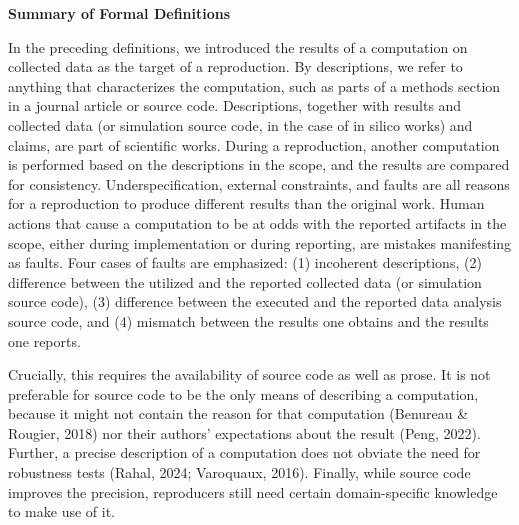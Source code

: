 \documentclass[authordate, meta]{jote-new-article}
\begin{document}
	\begin{rightWide}[Box 2]
	\textbf{Summary of Formal Definitions}
	
	In the preceding definitions, we introduced the results of a computation on collected data as the target of a reproduction. By descriptions, we refer to anything that characterizes the computation, such as parts of a methods section in a journal article or source code. Descriptions, together with results and collected data (or simulation source code, in the case of in silico works) and claims, are part of scientific works. During a reproduction, another computation is performed based on the descriptions in the scope, and the results are compared for consistency. Underspecification, external constraints, and faults are all reasons for a reproduction to produce different results than the original work. Human actions that cause a computation to be at odds with the reported artifacts in the scope, either during implementation or during reporting, are mistakes manifesting as faults. Four cases of faults are emphasized: (1) incoherent descriptions, (2) difference between the utilized and the reported collected data (or simulation source code), (3) difference between the executed and the reported data analysis source code, and (4) mismatch between the results one obtains and the results one reports.
	\end{rightWide}

	Crucially, this requires the availability of source code as well as prose. It is not preferable for source code to be the only means of describing a computation, because it might not contain the reason for that computation (Benureau \& Rougier, 2018) nor their authors' expectations about the result (Peng, 2022). Further, a precise description of a computation does not obviate the need for robustness tests (Rahal, 2024; Varoquaux, 2016). Finally, while source code improves the precision, reproducers still need certain domain-specific knowledge to make use of it.
\end{document}
